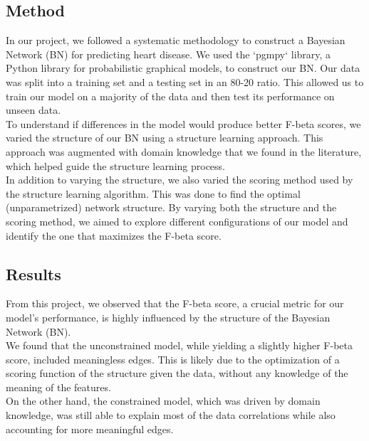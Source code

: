 \documentclass[letterpaper]{article}
\begin{document}
\subsection{Method}

In our project, we followed a systematic methodology to construct a Bayesian Network (BN) for predicting heart disease. We used the `pgmpy` library, a Python library for probabilistic graphical models, to construct our BN. Our data was split into a training set and a testing set in an 80-20 ratio. This allowed us to train our model on a majority of the data and then test its performance on unseen data. \\
To understand if differences in the model would produce better F-beta scores, we varied the structure of our BN using a structure learning approach. This approach was augmented with domain knowledge that we found in the literature, which helped guide the structure learning process. \\
In addition to varying the structure, we also varied the scoring method used by the structure learning algorithm. This was done to find the optimal (unparametrized) network structure. By varying both the structure and the scoring method, we aimed to explore different configurations of our model and identify the one that maximizes the F-beta score.

\subsection{Results}


From this project, we observed that the F-beta score, a crucial metric for our model's performance, is highly influenced by the structure of the Bayesian Network (BN). \\
We found that the unconstrained model, while yielding a slightly higher F-beta score, included meaningless edges. This is likely due to the optimization of a scoring function of the structure given the data, without any knowledge of the meaning of the features. \\
On the other hand, the constrained model, which was driven by domain knowledge, was still able to explain most of the data correlations while also accounting for more meaningful edges.
\end{document}
